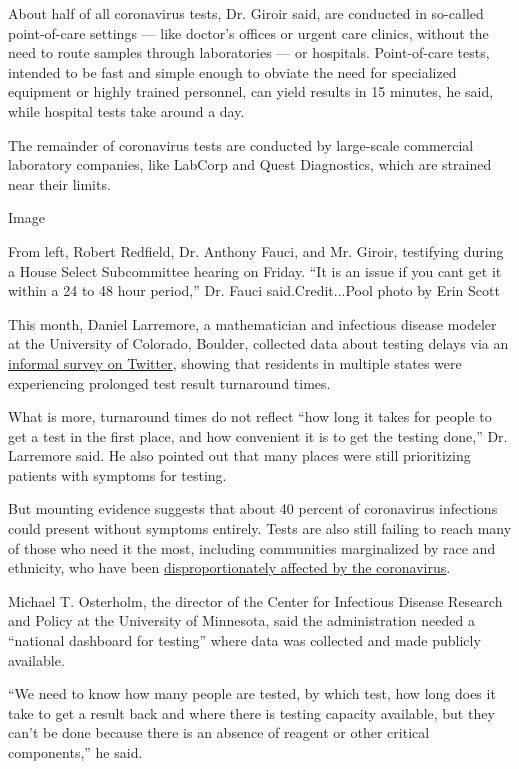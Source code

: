 About half of all coronavirus tests, Dr. Giroir said, are conducted in
so-called point-of-care settings --- like doctor's offices or urgent
care clinics, without the need to route samples through laboratories ---
or hospitals. Point-of-care tests, intended to be fast and simple enough
to obviate the need for specialized equipment or highly trained
personnel, can yield results in 15 minutes, he said, while hospital
tests take around a day.

The remainder of coronavirus tests are conducted by large-scale
commercial laboratory companies, like LabCorp and Quest Diagnostics,
which are strained near their limits.

Image

From left, Robert Redfield, Dr. Anthony Fauci, and Mr. Giroir,
testifying during a House Select Subcommittee hearing on Friday. ``It is
an issue if you cant get it within a 24 to 48 hour period,'' Dr. Fauci
said.Credit...Pool photo by Erin Scott

This month, Daniel Larremore, a mathematician and infectious disease
modeler at the University of Colorado, Boulder, collected data about
testing delays via an
\href{https://larremorelab.github.io/covid19testgroup}{informal survey
on Twitter}, showing that residents in multiple states were experiencing
prolonged test result turnaround times.

What is more, turnaround times do not reflect ``how long it takes for
people to get a test in the first place, and how convenient it is to get
the testing done,'' Dr. Larremore said. He also pointed out that many
places were still prioritizing patients with symptoms for testing.

But mounting evidence suggests that about 40 percent of coronavirus
infections could present without symptoms entirely. Tests are also still
failing to reach many of those who need it the most, including
communities marginalized by race and ethnicity, who have been
\href{https://www.nytimes.com/interactive/2020/07/05/us/coronavirus-latinos-african-americans-cdc-data.html}{disproportionately
affected by the coronavirus}.

Michael T. Osterholm, the director of the Center for Infectious Disease
Research and Policy at the University of Minnesota, said the
administration needed a ``national dashboard for testing'' where data
was collected and made publicly available.

``We need to know how many people are tested, by which test, how long
does it take to get a result back and where there is testing capacity
available, but they can't be done because there is an absence of reagent
or other critical components,'' he said.

